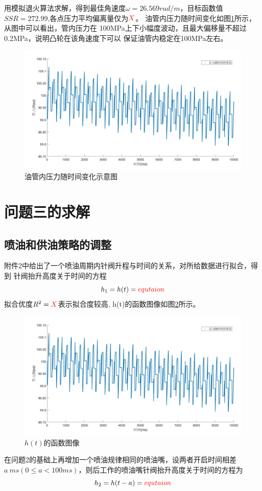 \documentclass[withoutpreface,bwprint]{cumcmthesis} %
\begin{document}
    用模拟退火算法求解，得到最佳角速度$\omega=26.569rad/m$，目标函数值
    $SSR=272.99$,各点压力平均偏离量仅为${\color{red}X}$。
    油管内压力随时间变化如图\ref{figure13}所示，从图中可以看出，管内压力在
    100MPa上下小幅度波动，且最大偏移量不超过0.2MPa，说明凸轮在该角速度下可以
    保证油管内稳定在100MPa左右。
    \begin{figure}[h]
    \centering
    \includegraphics[width=.8\textwidth]{q210s.jpg}
    \caption{油管内压力随时间变化示意图}
    \label{figure13}
    \end{figure}

\section{问题三的求解}
\subsection{喷油和供油策略的调整}
    附件2中给出了一个喷油周期内针阀升程与时间的关系，对所给数据进行拟合，得到
    针阀抬升高度关于时间的方程
    \begin{equation}
        h_1=h(t)={\color{red}equtaion}
    \label{equ54}
    \end{equation}
    拟合优度$R^2={\color{red}X}$表示拟合度较高,
    h(t)的函数图像如图{\ref{figure14}}所示。
    \begin{figure}[!h]
        \centering
        \includegraphics[width=.95\textwidth]{q210s.jpg}
        \caption{$h(t)$的函数图像}
        \label{figure14}
    \end{figure}
    在问题2的基础上再增加一个喷油规律相同的喷油嘴，设两者开启时间相差
    $a~ms(0 \leq a < 100ms)$，则后工作的喷油嘴针阀抬升高度关于时间的方程为
    \begin{equation}
        h_2=h(t-a)={\color{red}equtaion}
    \label{equ55}
    \end{equation}
\end{document}
